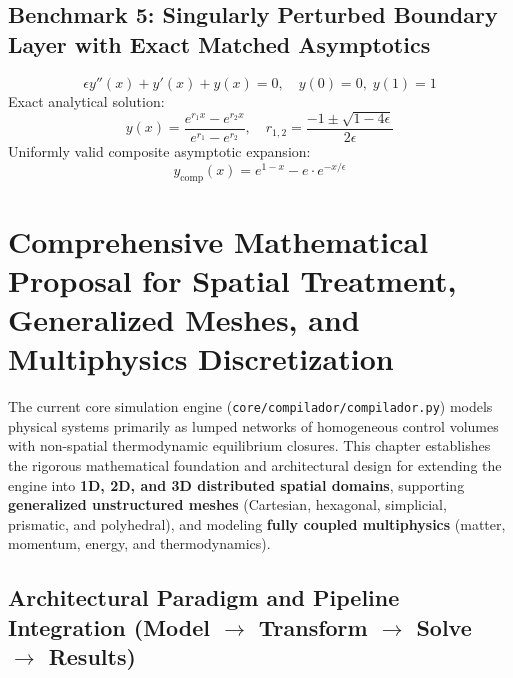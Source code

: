\documentclass[11pt,a4paper]{article}
\begin{document}
\subsection{Benchmark 5: Singularly Perturbed Boundary Layer with Exact Matched Asymptotics}
\begin{equation}
\epsilon y''(x) + y'(x) + y(x) = 0, \quad y(0) = 0, \; y(1) = 1
\end{equation}
Exact analytical solution:
\begin{equation}
y(x) = \frac{e^{r_1 x} - e^{r_2 x}}{e^{r_1} - e^{r_2}}, \quad r_{1, 2} = \frac{-1 \pm \sqrt{1 - 4\epsilon}}{2\epsilon}
\end{equation}
Uniformly valid composite asymptotic expansion:
\begin{equation}
y_{\text{comp}}(x) = e^{1-x} - e \cdot e^{-x/\epsilon}
\end{equation}


\section{Comprehensive Mathematical Proposal for Spatial Treatment, Generalized Meshes, and Multiphysics Discretization}

The current core simulation engine (\texttt{core/compilador/compilador.py}) models physical systems primarily as lumped networks of homogeneous control volumes with non-spatial thermodynamic equilibrium closures. This chapter establishes the rigorous mathematical foundation and architectural design for extending the engine into \textbf{1D, 2D, and 3D distributed spatial domains}, supporting \textbf{generalized unstructured meshes} (Cartesian, hexagonal, simplicial, prismatic, and polyhedral), and modeling \textbf{fully coupled multiphysics} (matter, momentum, energy, and thermodynamics).

\subsection{Architectural Paradigm and Pipeline Integration (Model $\to$ Transform $\to$ Solve $\to$ Results)}
\end{document}
